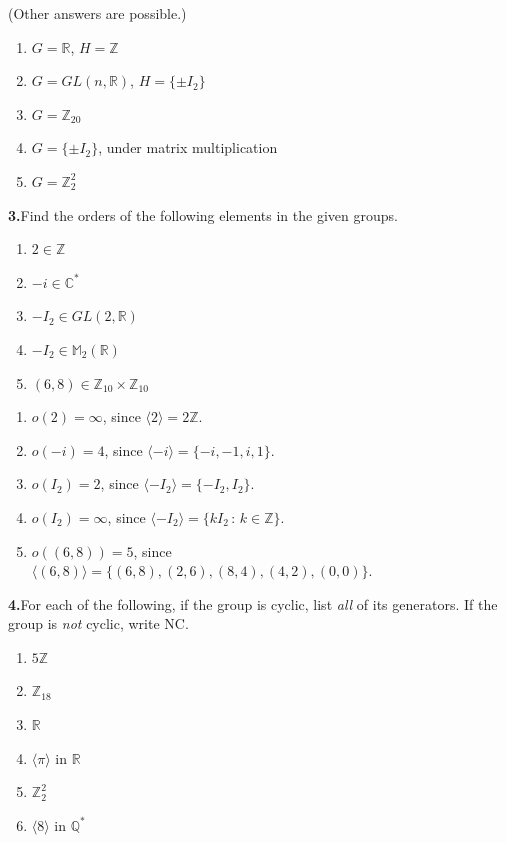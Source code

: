 \documentclass[10pt,]{book}
\theoremstyle{plain}
\theoremstyle{definition}
\theoremstyle{definition}
\theoremstyle{definition}
\theoremstyle{definition}
\numberwithin{equation}{section}
\def\Z{\mathbb{Z}}
\def\R{\mathbb{R}}
\def\Q{\mathbb{Q}}
\def\C{\mathbb{C}}
\def\M{\mathbb{M}}
\begin{document}
%
\par\smallskip
(Other answers are possible.) \leavevmode%
\begin{enumerate}[label=(\alph*)]
\item\hypertarget{li-281}{}\(G=\R\), \(H=\Z\)%
\item\hypertarget{li-282}{}\(G=GL(n,\R)\), \(H=\{\pm I_2\}\)%
\item\hypertarget{li-283}{}\(G=\Z_{20}\)%
\item\hypertarget{li-284}{}\(G=\{\pm I_2\}\), under matrix multiplication%
\item\hypertarget{li-285}{}\(G=\Z_2^2\)%
\end{enumerate}
%
\par\smallskip
\noindent\textbf{3.}\quad{}Find the orders of the following elements in the given groups. \leavevmode%
\begin{enumerate}[label=(\alph*)]
\item\hypertarget{li-286}{}\(2\in \Z\)%
\item\hypertarget{li-287}{}\(-i\in \C^*\)%
\item\hypertarget{li-288}{}\(-I_2\in GL(2,\R)\)%
\item\hypertarget{li-289}{}\(-I_2\in \M_2(\R)\)%
\item\hypertarget{li-290}{}\((6,8)\in \Z_{10}\times \Z_{10}\)%
\end{enumerate}
%
\par\smallskip
\leavevmode%
\begin{enumerate}[label=(\alph*)]
\item\hypertarget{li-291}{}\(o(2)=\infty\), since \(\langle 2\rangle =2\Z\).%
\item\hypertarget{li-292}{}\(o(-i)=4\), since \(\langle -i\rangle =\{-i,-1,i,1\}\).%
\item\hypertarget{li-293}{}\(o(I_2)=2\), since \(\langle -I_2\rangle =\{-I_2,I_2\}\).%
\item\hypertarget{li-294}{}\(o(I_2)=\infty\), since \(\langle -I_2\rangle =\{kI_2\,:\,k\in \Z\}\).%
\item\hypertarget{li-295}{}\(o((6,8))=5\), since \(\langle (6,8)\rangle =\{(6,8),(2,6),(8,4),(4,2),(0,0)\}\).%
\end{enumerate}
\par\smallskip
\noindent\textbf{4.}\quad{}For each of the following, if the group is cyclic, list \emph{all} of its generators. If the group is \emph{not} cyclic, write NC. \leavevmode%
\begin{enumerate}[label=(\alph*)]
\item\hypertarget{li-296}{}\(5\Z\)%
\item\hypertarget{li-297}{}\(\Z_{18}\)%
\item\hypertarget{li-298}{}\(\R\)%
\item\hypertarget{li-299}{}\(\langle \pi\rangle\) in \(\R\)%
\item\hypertarget{li-300}{}\(\Z_2^2\)%
\item\hypertarget{li-301}{}\(\langle 8\rangle\) in \(\Q^*\)%
\end{enumerate}
\end{document}
